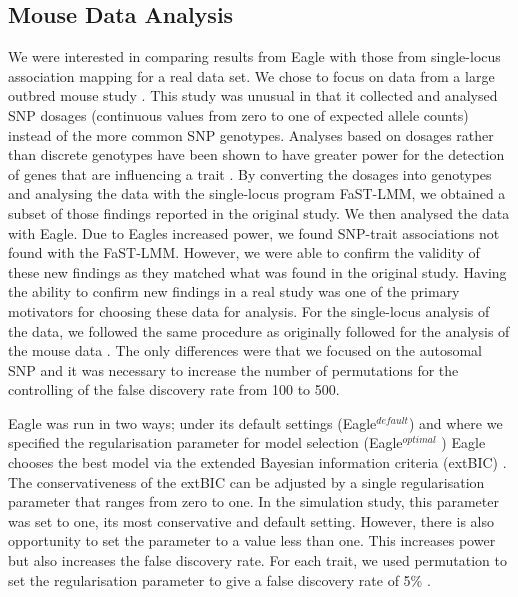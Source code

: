 \documentclass{article}
\begin{document}



\subsection{Mouse Data Analysis}

We were interested in comparing results from Eagle with those from single-locus association mapping for a real data set.
 We chose to focus on data from a large outbred mouse study \cite{nicod2016genome}. This study was unusual in that it collected and analysed SNP dosages (continuous values from zero to one of expected allele counts)  instead of the more common SNP genotypes. Analyses based on dosages rather than discrete genotypes have been shown to have greater power for the detection of genes that are influencing a trait  \cite{zheng2011comparison}. By converting the dosages into genotypes and analysing the data with the single-locus program FaST-LMM, we obtained a subset of those findings reported in the original study. We then analysed the data with Eagle. Due to Eagles increased power, we found SNP-trait associations not found with the FaST-LMM. However, we were 
 able to confirm the validity of these new findings as they matched what was found in the original study. Having the ability to confirm new findings 
 in a real study was 
 one of the primary motivators for choosing these data for analysis. 
For the single-locus analysis of the data, we followed the same procedure as originally followed for the analysis of the mouse data \cite{nicod2016genome}. The only differences were that we focused on the autosomal SNP and it was necessary to 
increase the number of permutations for the controlling of the false discovery rate from 100 to 500.

Eagle was run in two ways; under its default settings (Eagle$^{default}$) and where we specified the regularisation parameter for model selection (Eagle$^{optimal}$ ) Eagle chooses the best model via the extended Bayesian information criteria (extBIC) \cite{chen2008extended}. 
  The conservativeness of the extBIC can be adjusted by a single regularisation parameter that ranges from zero to one. In the simulation study, this parameter was set to one, its most conservative and default setting. However, there is also opportunity to set the parameter to a value less than one. This increases power but also increases the false discovery rate. For each trait, we used permutation to set the regularisation parameter to give a false discovery rate of 5\% .
\end{document}
